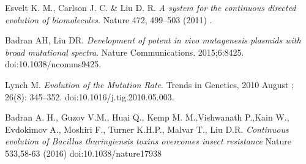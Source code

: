 \documentclass[10pt,letterpaper]{article}
\begin{document}



\nolinenumbers

\begin{thebibliography}{10}

Esvelt K. M., Carlson J. C. \& Liu D. R.
\newblock \textit{A system for the continuous directed evolution of biomolecules}.
\newblock Nature 472, 499–503 (2011) .

Badran AH, Liu DR.
\newblock \textit{{D}evelopment of potent in vivo mutagenesis plasmids with broad mutational spectra}.
\newblock Nature Communications. 2015;6:8425. doi:10.1038/ncomms9425.

Lynch M.
\newblock \textit{{E}volution of the Mutation Rate}.
\newblock Trends in Genetics, 2010 August ; 26(8): 345–352. doi:10.1016/j.tig.2010.05.003.

  Badran A. H., Guzov V.M., Huai Q., Kemp M. M.,Vishwanath P.,Kain W., Evdokimov A., Moshiri F., Turner K.H.P., Malvar T., Liu D.R.
  \newblock \textit{{C}ontinuous evolution of Bacillus thuringiensis toxins overcomes insect resistance}
  \newblock  Nature 533,58-63 (2016) doi:10.1038/nature17938
\end{thebibliography}
\end{document}
